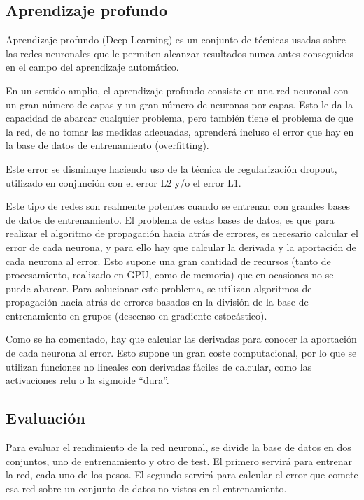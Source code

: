\subsection{Aprendizaje profundo}
Aprendizaje profundo (Deep Learning) \cite{schmidhuber2015deep}\cite{udacitydeeplearning} es un conjunto de técnicas usadas sobre las redes neuronales que le permiten alcanzar resultados nunca antes conseguidos en el campo del aprendizaje automático.

En un sentido amplio, el aprendizaje profundo consiste en una red neuronal con un gran número de capas y un gran número de neuronas por capas. Esto le da la capacidad de abarcar cualquier problema, pero también tiene el problema de que la red, de no tomar las medidas adecuadas, aprenderá incluso el error que hay en la base de datos de entrenamiento (overfitting).

Este error se disminuye haciendo uso de la técnica de regularización dropout, utilizado en conjunción con el error L2 y/o el error L1.

Este tipo de redes son realmente potentes cuando se entrenan con grandes bases de datos de entrenamiento. El problema de estas bases de datos, es que para realizar el algoritmo de propagación hacia atrás de errores, es necesario calcular el error de cada neurona, y para ello hay que calcular la derivada y la aportación de cada neurona al error. Esto supone una gran cantidad de recursos (tanto de procesamiento, realizado en GPU, como de memoria) que en ocasiones no se puede abarcar. Para solucionar este problema, se utilizan algoritmos de propagación hacia atrás de errores basados en la división de la base de entrenamiento en grupos (descenso en gradiente estocástico).

Como se ha comentado, hay que calcular las derivadas para conocer la aportación de cada neurona al error. Esto supone un gran coste computacional, por lo que se utilizan funciones no lineales con derivadas fáciles de calcular, como las activaciones relu o la sigmoide ``dura''.

\subsection{Evaluación}
Para evaluar el rendimiento de la red neuronal, se divide la base de datos en dos conjuntos, uno de entrenamiento y otro de test. El primero servirá para entrenar la red, cada uno de los pesos. El segundo servirá para calcular el error que comete esa red sobre un conjunto de datos no vistos en el entrenamiento.

